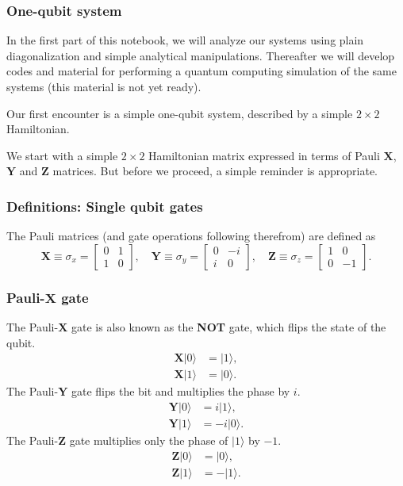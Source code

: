 \documentclass{beamer}
\begin{document}
\begin{frame}
\frametitle{One-qubit system}

In the first part of this notebook, we will analyze our systems using
plain diagonalization and simple analytical manipulations.  Thereafter
we will develop codes and material for performing a quantum computing
simulation of the same systems (this material is not yet ready).

Our first encounter is a simple one-qubit system, described by a simple $2\times 2$ Hamiltonian.

We start with a simple $2\times 2$ Hamiltonian matrix expressed in
terms of Pauli $\bm{X}$, $\bm{Y}$  and $\bm{Z}$ matrices. But before we proceed, a simple reminder is appropriate.
\end{frame}

\begin{frame}
\frametitle{Definitions: Single qubit gates}

The Pauli matrices (and gate operations following therefrom) are defined as
\[
	\bm{X} \equiv \sigma_x = \begin{bmatrix}
		0 & 1 \\
		1 & 0
	\end{bmatrix}, \quad
	\bm{Y} \equiv \sigma_y = \begin{bmatrix}
		0 & -i \\
		i & 0
	\end{bmatrix}, \quad
	\bm{Z} \equiv \sigma_z = \begin{bmatrix}
		1 & 0 \\
		0 & -1
	\end{bmatrix}.
\]
\end{frame}

\begin{frame}
\frametitle{Pauli-$\bm{X}$ gate}

The Pauli-$\bm{X}$ gate is also known as the \textbf{NOT} gate, which flips the state of the qubit.
\begin{align*}
	\bm{X}\vert 0\rangle &= \vert 1\rangle, \\
	\bm{X}\vert 1\rangle &= \vert 0\rangle.	
\end{align*}
The Pauli-$\bm{Y}$ gate flips the bit and multiplies the phase by $ i $. 
\begin{align*}
	\bm{Y}\vert 0\rangle &= i\vert 1\rangle, \\
	\bm{Y}\vert 1\rangle &= -i\vert 0\rangle.
\end{align*}
The Pauli-$\bm{Z}$ gate multiplies only the phase of $\vert 1\rangle$ by $ -1 $.
\begin{align*}
	\bm{Z}\vert 0\rangle &= \vert 0\rangle, \\
	\bm{Z}\vert 1\rangle &= -\vert 1\rangle.
\end{align*}
\end{frame}
\end{document}
